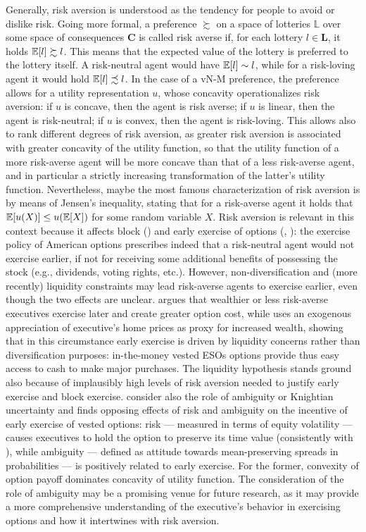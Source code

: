     Generally, risk aversion is understood as the tendency for people to avoid or dislike risk. Going more formal, a preference $\succsim$ on a space of lotteries $\mathbb{L}$ over some space of consequences $\mathbf{C}$ is called risk averse if, for each lottery $l \in \mathbf{L}$, it holds $\operatorname{\mathbb{E}}[l] \succsim l$. This means that the expected value of the lottery is preferred to the lottery itself. A risk-neutral agent would have $\operatorname{\mathbb{E}}[l] \sim l$, while for a risk-loving agent it would hold $\operatorname{\mathbb{E}}[l] \precsim l$. In the case of a vN-M preference, the preference allows for a utility representation $u$, whose concavity operationalizes risk aversion: if $u$ is concave, then the agent is risk averse; if $u$ is linear, then the agent is risk-neutral; if $u$ is convex, then the agent is risk-loving. This allows also to rank different degrees of risk aversion, as greater risk aversion is associated with greater concavity of the utility function, so that the utility function of a more risk-averse agent will be more concave than that of a less risk-averse agent, and in particular a strictly increasing transformation of the latter's utility function. Nevertheless, maybe the most famous characterization of risk aversion is by means of Jensen's inequality, stating that for a risk-averse agent it holds that $\operatorname{\mathbb{E}}[u(X)] \leq u(\operatorname{\mathbb{E}}[X])$ for some random variable $X$.
    Risk aversion is relevant in this context because it affects block (\cite{grasselli2009risk}) and early exercise of options (\cite{izhakian2017risk}, \cite{murphy2019employees}): the exercise policy of American options prescribes indeed that a risk-neutral agent would not exercise earlier, if not for receiving some additional benefits of possessing the stock (e.g., dividends, voting rights, etc.). However, non-diversification and (more recently) liquidity constraints may lead risk-averse agents to exercise earlier, even though the two effects are unclear. \cite{carpenter2010optimal} argues that wealthier or less risk-averse executives exercise later and create greater option cost, while \cite{murphy2019employees} uses an exogenous appreciation of executive's home prices as proxy for increased wealth, showing that in this circumstance early exercise is driven by liquidity concerns rather than diversification purposes: in-the-money vested ESOs options provide thus easy access to cash to make major purchases. The liquidity hypothesis stands ground also because of implausibly high levels of risk aversion needed to justify early exercise and block exercise. 
    \cite{izhakian2017risk} consider also the role of ambiguity or Knightian uncertainty and finds opposing effects of risk and ambiguity on the incentive of early exercise of vested options: risk --- measured in terms of equity volatility --- causes executives to hold the option to preserve its time value (consistently with \cite{heron2017stock}), while ambiguity --- defined as attitude towards mean-preserving spreads in probabilities --- is positively related to early exercise. For the former, convexity of option payoff dominates concavity of utility function. The consideration of the role of ambiguity may be a promising venue for future research, as it may provide a more comprehensive understanding of the executive's behavior in exercising options and how it intertwines with risk aversion.
